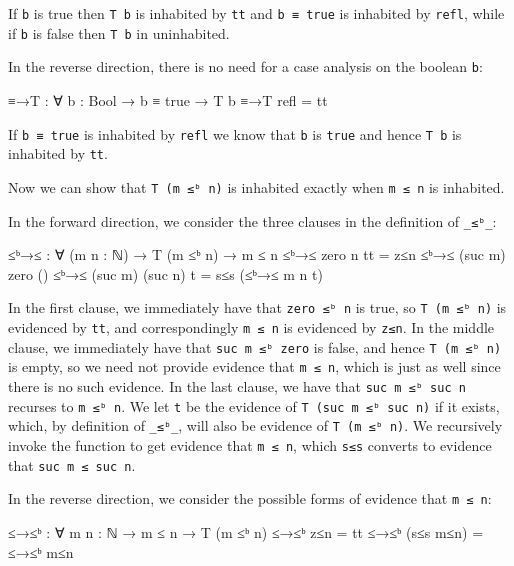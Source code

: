 If \texttt{b} is true then \texttt{T\ b} is inhabited by \texttt{tt} and
\texttt{b\ ≡\ true} is inhabited by \texttt{refl}, while if \texttt{b}
is false then \texttt{T\ b} in uninhabited.

In the reverse direction, there is no need for a case analysis on the
boolean \texttt{b}:

\begin{fence}
\begin{code}
≡→T : ∀ {b : Bool} → b ≡ true → T b
≡→T refl  =  tt
\end{code}
\end{fence}

If \texttt{b\ ≡\ true} is inhabited by \texttt{refl} we know that
\texttt{b} is \texttt{true} and hence \texttt{T\ b} is inhabited by
\texttt{tt}.

Now we can show that \texttt{T\ (m\ ≤ᵇ\ n)} is inhabited exactly when
\texttt{m\ ≤\ n} is inhabited.

In the forward direction, we consider the three clauses in the
definition of \texttt{\_≤ᵇ\_}:

\begin{fence}
\begin{code}
≤ᵇ→≤ : ∀ (m n : ℕ) → T (m ≤ᵇ n) → m ≤ n
≤ᵇ→≤ zero    n       tt  =  z≤n
≤ᵇ→≤ (suc m) zero    ()
≤ᵇ→≤ (suc m) (suc n) t   =  s≤s (≤ᵇ→≤ m n t)
\end{code}
\end{fence}

In the first clause, we immediately have that \texttt{zero\ ≤ᵇ\ n} is
true, so \texttt{T\ (m\ ≤ᵇ\ n)} is evidenced by \texttt{tt}, and
correspondingly \texttt{m\ ≤\ n} is evidenced by \texttt{z≤n}. In the
middle clause, we immediately have that \texttt{suc\ m\ ≤ᵇ\ zero} is
false, and hence \texttt{T\ (m\ ≤ᵇ\ n)} is empty, so we need not provide
evidence that \texttt{m\ ≤\ n}, which is just as well since there is no
such evidence. In the last clause, we have that
\texttt{suc\ m\ ≤ᵇ\ suc\ n} recurses to \texttt{m\ ≤ᵇ\ n}. We let
\texttt{t} be the evidence of \texttt{T\ (suc\ m\ ≤ᵇ\ suc\ n)} if it
exists, which, by definition of \texttt{\_≤ᵇ\_}, will also be evidence
of \texttt{T\ (m\ ≤ᵇ\ n)}. We recursively invoke the function to get
evidence that \texttt{m\ ≤\ n}, which \texttt{s≤s} converts to evidence
that \texttt{suc\ m\ ≤\ suc\ n}.

In the reverse direction, we consider the possible forms of evidence
that \texttt{m\ ≤\ n}:

\begin{fence}
\begin{code}
≤→≤ᵇ : ∀ {m n : ℕ} → m ≤ n → T (m ≤ᵇ n)
≤→≤ᵇ z≤n        =  tt
≤→≤ᵇ (s≤s m≤n)  =  ≤→≤ᵇ m≤n
\end{code}
\end{fence}

